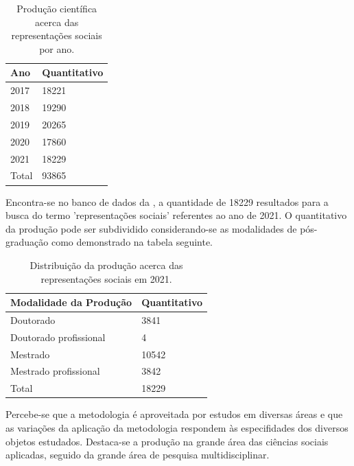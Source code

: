\documentclass[
   article,       %
   11pt,          %
   oneside,       %
   a4paper,       %
   english,       %
   brazil,           %
   sumario=tradicional
   ]{abntex2}
\begin{document}
\begin{table}[htb]
\centering
\caption{Produção científica acerca das representações sociais por ano.}
\label{tab-nivinv}
\begin{tabular}{p{6.0cm}|p{6.0cm}}
    \textbf{Ano} & \textbf{Quantitativo} \\
    \hline
    2017 & 18221 \\
    \hline
    2018 & 19290 \\
    \hline
    2019 & 20265 \\
    \hline
    2020 & 17860 \\
    \hline
    2021 & 18229 \\
    \hline
    \hline
    Total & 93865 \\
\end{tabular}
\end{table}

Encontra-se no banco de dados da , a quantidade de 18229 resultados para a busca do termo 'representações sociais' referentes ao ano de 2021. O quantitativo da produção pode ser subdividido considerando-se as modalidades de pós-graduação como demonstrado na tabela seguinte.

\begin{table}[htb]
\centering
\caption{Distribuição da produção acerca das representações sociais em 2021.}
\label{tab-nivinv}
\begin{tabular}{p{6.0cm}|p{6.0cm}}
   \textbf{Modalidade da Produção} & \textbf{Quantitativo} \\
    \hline
    Doutorado & 3841 \\
    \hline
    Doutorado profissional & 4 \\
    \hline
    Mestrado & 10542 \\
    \hline
    Mestrado profissional & 3842 \\
    \hline
    \hline
    Total & 18229 \\
\end{tabular}
\end{table}


Percebe-se que a metodologia é aproveitada por estudos em diversas áreas e que as variações da aplicação da metodologia respondem às especifidades dos diversos objetos estudados. Destaca-se a produção na grande área das ciências sociais aplicadas, seguido da grande área de pesquisa multidisciplinar.
\end{document}
